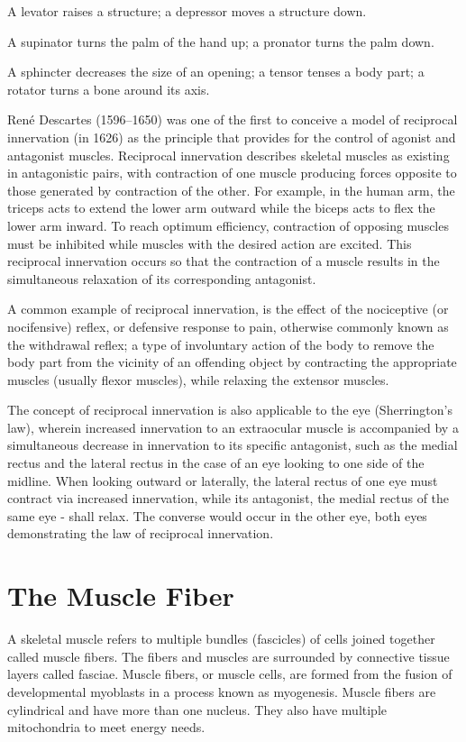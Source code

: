A levator raises a structure; a depressor moves a structure down.

A supinator turns the palm of the hand up; a pronator turns the palm down.

A sphincter decreases the size of an opening; a tensor tenses a body part; a rotator turns a bone around its axis.

René Descartes (1596--1650) was one of the first to conceive a model of reciprocal innervation (in 1626) as the principle that provides for the control of agonist and antagonist muscles. Reciprocal innervation describes skeletal muscles as existing in antagonistic pairs, with contraction of one muscle producing forces opposite to those generated by contraction of the other. For example, in the human arm, the triceps acts to extend the lower arm outward while the biceps acts to flex the lower arm inward. To reach optimum efficiency, contraction of opposing muscles must be inhibited while muscles with the desired action are excited. This reciprocal innervation occurs so that the contraction of a muscle results in the simultaneous relaxation of its corresponding antagonist.

A common example of reciprocal innervation, is the effect of the nociceptive (or nocifensive) reflex, or defensive response to pain, otherwise commonly known as the withdrawal reflex; a type of involuntary action of the body to remove the body part from the vicinity of an offending object by contracting the appropriate muscles (usually flexor muscles), while relaxing the extensor muscles.

The concept of reciprocal innervation is also applicable to the eye (Sherrington's law), wherein increased innervation to an extraocular muscle is accompanied by a simultaneous decrease in innervation to its specific antagonist, such as the medial rectus and the lateral rectus in the case of an eye looking to one side of the midline. When looking outward or laterally, the lateral rectus of one eye must contract via increased innervation, while its antagonist, the medial rectus of the same eye - shall relax. The converse would occur in the other eye, both eyes demonstrating the law of reciprocal innervation.

\hypertarget{the-muscle-fiber}{%
\section{The Muscle Fiber}\label{the-muscle-fiber}}

A skeletal muscle refers to multiple bundles (fascicles) of cells joined together called muscle fibers. The fibers and muscles are surrounded by connective tissue layers called fasciae. Muscle fibers, or muscle cells, are formed from the fusion of developmental myoblasts in a process known as myogenesis. Muscle fibers are cylindrical and have more than one nucleus. They also have multiple mitochondria to meet energy needs.

